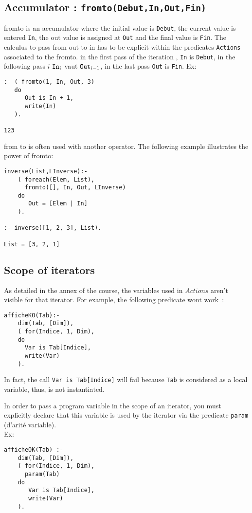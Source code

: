 \subsection{Accumulator : {\tt fromto(Debut,In,Out,Fin)}}
  fromto is an accumulator where the initial value is \verb|Debut|, the current value is entered 
  \verb|In|, the out value is assigned at \verb|Out| and the final value is  \verb|Fin|. The calculus to pass from out to in has to be explicit within the predicates  \verb|Actions| associated to the 
  fromto. in the first pass of the iteration , \verb|In| is \verb|Debut|, in the following
  pass $i$ $\verb|In|_i$ vaut $\verb|Out|_{i - 1}$, in the last pass
  \verb|Out| is \verb|Fin|. Ex: 
\begin{verbatim}
:- ( fromto(1, In, Out, 3) 
   do 
      Out is In + 1, 
      write(In)
   ).

123  
\end{verbatim}

from to is often used with another operator. The following example illustrates the power of fromto:
\begin{verbatim}
inverse(List,LInverse):- 
    ( foreach(Elem, List), 
      fromto([], In, Out, LInverse) 
    do 
       Out = [Elem | In]
    ).

:- inverse([1, 2, 3], List).

List = [3, 2, 1]
\end{verbatim}

\subsection*{Scope of iterators}
As detailed in the annex of the course, the variables used in  $Actions$ aren't visible for that iterator.  For example, the following predicate wont work~:
\begin{verbatim}
afficheKO(Tab):-
    dim(Tab, [Dim]),
    ( for(Indice, 1, Dim),
    do 
      Var is Tab[Indice],
      write(Var)
    ).
\end{verbatim}
In fact, the call \verb|Var is Tab[Indice]| will fail because \verb|Tab| is considered as a local variable, thus, is not instantiated. 

In order to pass a program variable in the scope of an iterator, you must explicitly declare that this variable is used by the iterator via the predicate
 \verb|param| (d'arité variable).\\
Ex: 
\begin{verbatim}
afficheOK(Tab) :-
    dim(Tab, [Dim]),    
    ( for(Indice, 1, Dim), 
      param(Tab) 
    do 
       Var is Tab[Indice], 
       write(Var)
    ). 
\end{verbatim}

